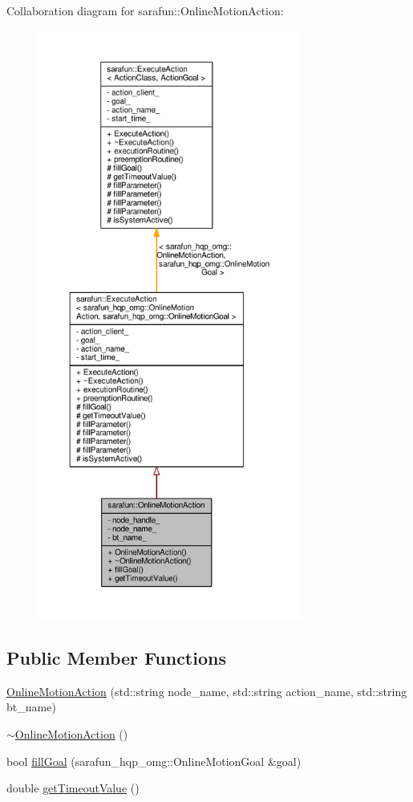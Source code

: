 Collaboration diagram for sarafun\-:\-:Online\-Motion\-Action\-:
\nopagebreak
\begin{figure}[H]
\begin{center}
\leavevmode
\includegraphics[height=550pt]{da/d9c/classsarafun_1_1OnlineMotionAction__coll__graph}
\end{center}
\end{figure}
\subsection*{Public Member Functions}
\begin{DoxyCompactItemize}
\item 
\hyperlink{classsarafun_1_1OnlineMotionAction_ab66225e6e9383411dc925e88fb1cf4f9_ab66225e6e9383411dc925e88fb1cf4f9}{Online\-Motion\-Action} (std\-::string node\-\_\-name, std\-::string action\-\_\-name, std\-::string bt\-\_\-name)
\item 
\hyperlink{classsarafun_1_1OnlineMotionAction_a63134a65e9ead7a8250abe2afee5b388_a63134a65e9ead7a8250abe2afee5b388}{$\sim$\-Online\-Motion\-Action} ()
\item 
bool \hyperlink{classsarafun_1_1OnlineMotionAction_aacaa264dad7ba07b5c9a985d66ea48f7_aacaa264dad7ba07b5c9a985d66ea48f7}{fill\-Goal} (sarafun\-\_\-hqp\-\_\-omg\-::\-Online\-Motion\-Goal \&goal)
\item 
double \hyperlink{classsarafun_1_1OnlineMotionAction_a453e7dca41a0d73b5297ce191e760b31_a453e7dca41a0d73b5297ce191e760b31}{get\-Timeout\-Value} ()
\end{DoxyCompactItemize}
